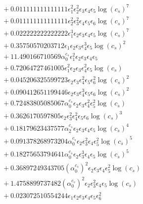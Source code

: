 \documentclass[10pt]{article}
\begin{document}
\begin{align*}
&{}  + 0.011111111111111 \epsilon_{1}^{2} \epsilon_{2}^{2} \epsilon_{3} \epsilon_{4} \epsilon_{5} \log{\left(c_{s} \right)}^{7} \\
&{}  + 0.011111111111111 \epsilon_{2}^{2} \epsilon_{3}^{2} \epsilon_{4} \epsilon_{5} \epsilon_{6} \log{\left(c_{s} \right)}^{7} \\
&{}  + 0.022222222222222 \epsilon_{1}^{3} \epsilon_{2} \epsilon_{3} \epsilon_{4} \epsilon_{5} \log{\left(c_{s} \right)}^{7} \\
&{}  + 0.35750570203712 \epsilon_{1} \epsilon_{2} \epsilon_{3} \epsilon_{4}^{3} \epsilon_{5} \log{\left(c_{s} \right)}^{2} \\
&{}  + 11.490166710569 \alpha_{0}^{c_s} \epsilon_{1}^{2} \epsilon_{2} \epsilon_{3} \epsilon_{4} \epsilon_{5} \\
&{}  + 0.72064727461005 \epsilon_{1}^{2} \epsilon_{2} \epsilon_{3} \epsilon_{4}^{2} \epsilon_{5} \log{\left(c_{s} \right)} \\
&{}  + 0.045206325599723 \epsilon_{2} \epsilon_{3} \epsilon_{4}^{2} \epsilon_{5} \epsilon_{6}^{2} \log{\left(c_{s} \right)}^{2} \\
&{}  + 0.090412651199446 \epsilon_{2} \epsilon_{3} \epsilon_{4}^{3} \epsilon_{5} \epsilon_{6} \log{\left(c_{s} \right)}^{2} \\
&{}  + 0.72483805085067 \alpha_{0}^{c_s} \epsilon_{2} \epsilon_{3} \epsilon_{4}^{2} \epsilon_{5}^{2} \log{\left(c_{s} \right)} \\
&{}  + 0.3626170597805 \epsilon_{2} \epsilon_{3}^{2} \epsilon_{4}^{2} \epsilon_{5} \epsilon_{6} \log{\left(c_{s} \right)}^{3} \\
&{}  + 0.18179623437577 \alpha_{2}^{c_s} \epsilon_{2} \epsilon_{3} \epsilon_{4} \epsilon_{5} \log{\left(c_{s} \right)}^{4} \\
&{}  + 0.091378268973204 \alpha_{0}^{c_s} \epsilon_{2} \epsilon_{3}^{2} \epsilon_{4} \epsilon_{5}^{2} \log{\left(c_{s} \right)}^{5} \\
&{}  + 0.18275653794641 \alpha_{0}^{c_s} \epsilon_{2} \epsilon_{3}^{3} \epsilon_{4} \epsilon_{5} \log{\left(c_{s} \right)}^{5} \\
&{}  + 0.36897249343705 \left(\alpha_{0}^{c_s}\right)^{2} \epsilon_{2} \epsilon_{3} \epsilon_{4} \epsilon_{5}^{2} \log{\left(c_{s} \right)} \\
&{}  + 1.4758899737482 \left(\alpha_{0}^{c_s}\right)^{2} \epsilon_{2} \epsilon_{3}^{2} \epsilon_{4} \epsilon_{5} \log{\left(c_{s} \right)} \\
&{}  + 0.023072510554244 \epsilon_{1} \epsilon_{2} \epsilon_{3} \epsilon_{4} \epsilon_{5} \epsilon_{6}^{2} \\

\end{align*}
\end{document}
